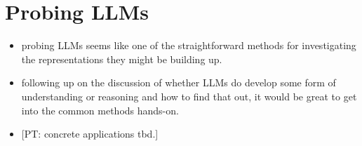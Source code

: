\documentclass[fleqn,reqno,10pt]{article}
\newcommand{\pt}[1]{\textcolor{CSP-accent-1}{[PT: #1]}}
\begin{document}
\section{Probing LLMs}
\begin{itemize}
	\item probing LLMs seems like one of the straightforward methods for investigating the representations they might be building up. 
	\item following up on the discussion of whether LLMs do develop some form of understanding or reasoning and how to find that out, it would be great to get into the common methods hands-on. 
	\item \pt{concrete applications tbd.}
\end{itemize}


\printbibliography[heading=bibintoc]
\end{document}
